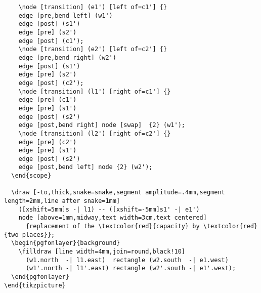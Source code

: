 \begin{lstlisting}
    \node [transition] (e1') [left of=c1'] {}
    edge [pre,bend left] (w1')
    edge [post] (s1')
    edge [pre] (s2')
    edge [post] (c1');
    \node [transition] (e2') [left of=c2'] {}
    edge [pre,bend right] (w2')
    edge [post] (s1')
    edge [pre] (s2')
    edge [post] (c2');
    \node [transition] (l1') [right of=c1'] {}
    edge [pre] (c1')
    edge [pre] (s1')
    edge [post] (s2')
    edge [post,bend right] node [swap]  {2} (w1');
    \node [transition] (l2') [right of=c2'] {}
    edge [pre] (c2')
    edge [pre] (s1')
    edge [post] (s2')
    edge [post,bend left] node {2} (w2');
  \end{scope}

  \draw [-to,thick,snake=snake,segment amplitude=.4mm,segment length=2mm,line after snake=1mm]
    ([xshift=5mm]s -| l1) -- ([xshift=-5mm]s1' -| e1')
    node [above=1mm,midway,text width=3cm,text centered]
      {replacement of the \textcolor{red}{capacity} by \textcolor{red}{two places}};
  \begin{pgfonlayer}{background}
    \filldraw [line width=4mm,join=round,black!10]
      (w1.north  -| l1.east)  rectangle (w2.south  -| e1.west)
      (w1'.north -| l1'.east) rectangle (w2'.south -| e1'.west);
  \end{pgfonlayer}
\end{tikzpicture}

\end{lstlisting}
